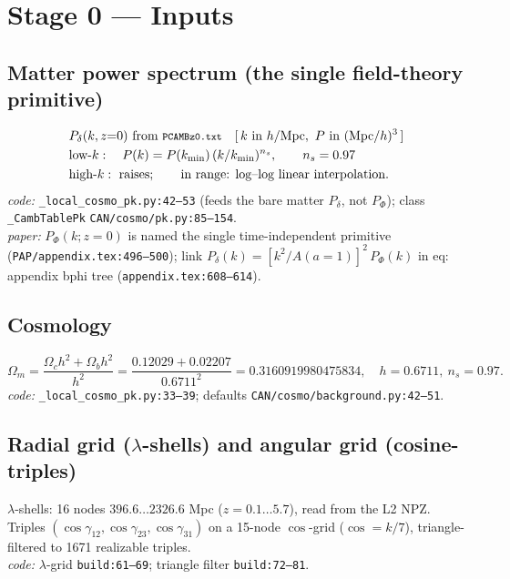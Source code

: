 \documentclass[11pt]{article}
\newcommand{\code}[1]{\texttt{\footnotesize #1}}
\newcommand{\eq}[1]{\textsf{#1}}                 %
\newcommand{\lam}{\lambda}
\begin{document}
\section{Stage 0 --- Inputs}
\subsection{Matter power spectrum (the single field-theory primitive)}
\begin{align}
&P_\delta(k,z{=}0)\ \text{from \code{PCAMBz0.txt}}\quad
   [\,k\ \text{in } h/\mathrm{Mpc},\ P\ \text{in } (\mathrm{Mpc}/h)^3\,]\notag\\
&\text{low-}k:\quad P(k)=P(k_{\min})\,(k/k_{\min})^{n_s},\qquad n_s=0.97\notag\\
&\text{high-}k:\ \text{raises};\qquad \text{in range: log--log linear interpolation.}
\end{align}
\textit{code:} \code{\_local\_cosmo\_pk.py:42--53} (feeds the bare matter $P_\delta$,
not $P_\Phi$); class \code{\_CambTablePk} \code{CAN/cosmo/pk.py:85--154}.\\
\textit{paper:} $P_\Phi(k;z{=}0)$ is named the single time-independent primitive
(\code{PAP/appendix.tex:496--500}); link $P_\delta(k)=[k^2/A(a{=}1)]^2\,P_\Phi(k)$ in
\eq{eq: appendix bphi tree} (\code{appendix.tex:608--614}).

\subsection{Cosmology}
\begin{equation}
\Omega_m=\frac{\Omega_c h^2+\Omega_b h^2}{h^2}
        =\frac{0.12029+0.02207}{0.6711^2}=0.3160919980475834,\quad h=0.6711,\ n_s=0.97.
\end{equation}
\textit{code:} \code{\_local\_cosmo\_pk.py:33--39}; defaults \code{CAN/cosmo/background.py:42--51}.

\subsection{Radial grid ($\lam$-shells) and angular grid (cosine-triples)}
$\lam$-shells: 16 nodes $396.6\ldots 2326.6$ Mpc ($z=0.1\ldots 5.7$), read from the L2 NPZ.
Triples $(\cos\gamma_{12},\cos\gamma_{23},\cos\gamma_{31})$ on a 15-node $\cos$-grid
($\cos=k/7$), triangle-filtered to 1671 realizable triples.\\
\textit{code:} $\lam$-grid \code{build:61--69}; triangle filter \code{build:72--81}.
\end{document}
